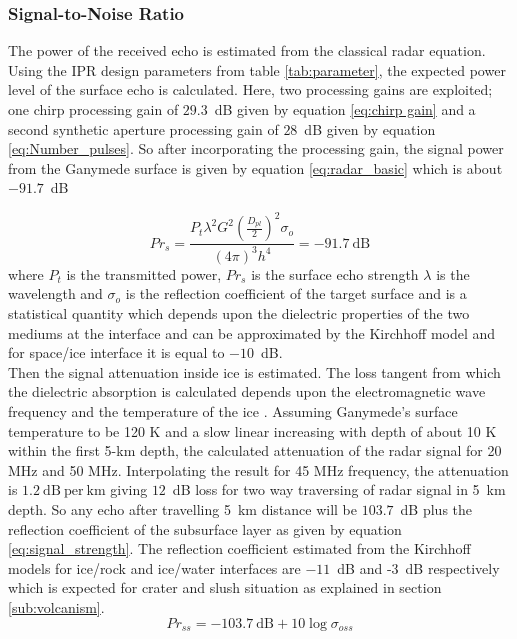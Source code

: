 \subsubsection{Signal-to-Noise Ratio}

The power of the received echo is estimated from the classical radar equation. Using the \ac{IPR} design parameters from table \ref{tab:parameter}, the expected power level of the surface echo is calculated. Here, two processing gains are exploited; one chirp processing gain of $29.3$~dB given by equation \ref{eq:chirp gain} and a second synthetic aperture processing gain of $28$~dB given by equation \ref{eq:Number_pulses}. So after incorporating the processing gain, the signal power from the Ganymede surface is given by equation \ref{eq:radar_basic} which is about $-91.7$~dB

\begin{equation}
Pr_{s} = \dfrac{P_{t}\lambda^{2}G^{2}(\frac{D_{pl}}{2})^{2}\sigma_{o}}{(4\pi)^{3}h^{4}} 
	  = -91.7 \mathrm{~dB} 
\label{eq:radar_basic}
\end{equation}
where $P_{t}$ is the transmitted power, $Pr_{s}$ is the surface echo strength $\lambda$ is the wavelength  and $\sigma_{o}$ is the reflection coefficient of the target surface and is a statistical quantity which depends upon the dielectric properties of the two mediums at the interface and can be approximated by the Kirchhoff model \cite{MIMOSA} and for space/ice interface it is equal to $-10$~dB.\\
%
Then the signal attenuation inside ice is estimated. The loss tangent from which the dielectric absorption is calculated depends upon the electromagnetic wave frequency and the temperature of the ice \cite{MIMOSA}. Assuming Ganymede's surface temperature to be 120 K and a slow linear increasing with depth of about 10 K within the first 5-km depth\cite{Gany_SRS}, the calculated attenuation of the radar signal for 20 MHz and 50 MHz. Interpolating the result for 45 MHz frequency, the attenuation is $1.2 \mathrm{~dB~per~km}$ giving $12$~dB loss for two way traversing of radar signal in 5~km depth. So any echo after travelling 5~km distance will be $103.7$~dB plus the reflection coefficient of the subsurface layer as given by equation \ref{eq:signal_strength}. The reflection coefficient estimated from the Kirchhoff models for ice/rock and ice/water interfaces are $-11$~dB and -3~dB respectively which is expected for  crater and slush situation as explained in section \ref{sub:volcanism}.
%
\begin{equation}
Pr_{ss} = -103.7 \mathrm{~dB} + 10 \log \sigma_{oss}
\label{eq:signal_strength}
\end{equation}
